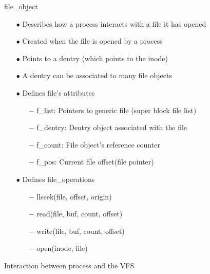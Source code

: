 \documentclass{beamer}
\begin{document}
\begin{frame}{file\_object}
	\begin{itemize}[<+->]
		\item[$\bullet$]{Describes how a process interacts with a file it has opened}
		\item[$\bullet$]{Created when the file is opened by a process}
		\item[$\bullet$]{Points to a dentry (which points to the inode)}
		\item[$\bullet$]{A dentry can be associated to many file objects}

		\item[$\bullet$]{Defines file's attributes}
			\begin{itemize}
				\item[$-$]{f\_list: Pointers to generic file (super block file list)}
				\item[$-$]{f\_dentry: Dentry object associated with the file}
				\item[$-$]{f\_count: File object's reference counter}
				\item[$-$]{f\_pos: Current file offset(file pointer)}
			\end{itemize}
		\item[$\bullet$]{Defines file\_operations}
			\begin{itemize}
				\item[$-$]{llseek(file, offset, origin)}
				\item[$-$]{read(file, buf, count, offset)}
				\item[$-$]{write(file, buf, count, offset)}
				\item[$-$]{open(inode, file)}
			\end{itemize}
	\end{itemize}
\end{frame}

\begin{frame}{Interaction between process and the VFS}
	
	\let\thefootnote\relax{}

\end{frame}
\end{document}
